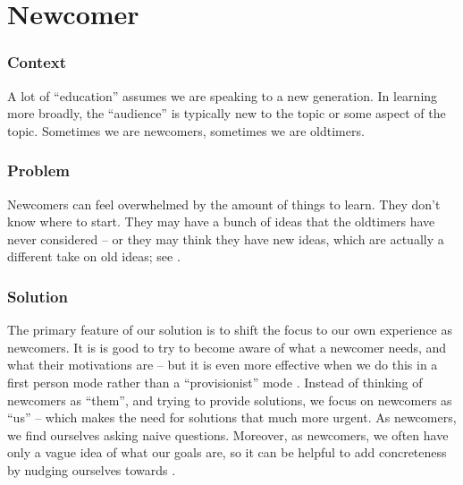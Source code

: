 

\section{Newcomer}\label{sec:Newcomer}

\subsubsection*{Context}
A lot of ``education'' assumes we are speaking to a new generation. 
In learning more broadly, the ``audience'' is typically new to the topic or some aspect of the topic.
Sometimes we are newcomers, sometimes we are oldtimers.

\subsubsection*{Problem} Newcomers can feel overwhelmed by the amount of things to learn.  They
don't know where to start.  They may have a bunch of ideas that the
oldtimers have never considered -- or they may think they have new
ideas, which are actually a different take on old ideas; see
.

\subsubsection*{Solution} The primary feature of our solution is to shift the
focus to our own experience as newcomers.  It is is good to try to become aware of
what a newcomer needs, and what their motivations are -- but it is even more
effective when we do this in a first person mode rather than a ``provisionist''
mode \cite{boud2005peer}.  Instead of thinking of newcomers as ``them'',
and trying to provide solutions, we focus on newcomers as ``us'' -- which
makes the need for solutions that much more urgent. 
As newcomers, we find ourselves asking naive questions.
Moreover, as newcomers, we often have only a vague idea of what our goals are, so
it can be helpful to add concreteness by nudging ourselves
towards .

%
